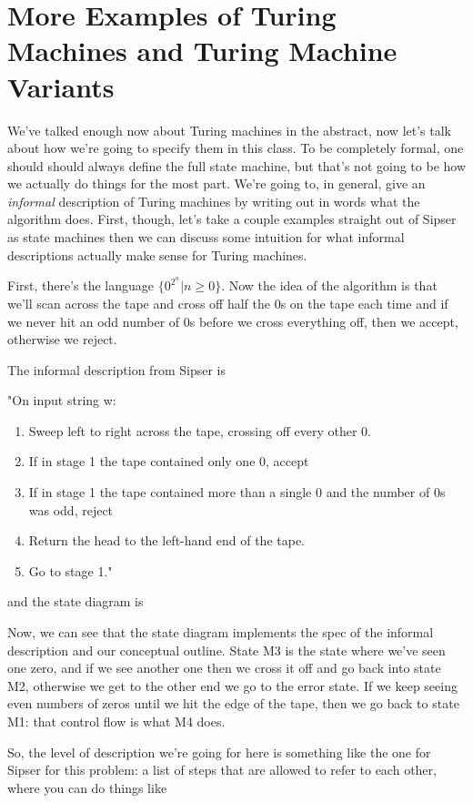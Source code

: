\documentclass[11pt]{article}
\begin{document}
\section{More Examples of Turing Machines and Turing Machine Variants}
\label{sec-11}
We've talked enough now about Turing machines in the abstract, now let's talk about how we're going to specify them in this class. To be completely formal, one should should always define the full state machine, but that's not going to be how we actually do things for the most part. We're going to, in general, give an \emph{informal} description of Turing machines by writing out in words what the algorithm does. First, though, let's take a couple examples straight out of Sipser as state machines then we can discuss some intuition for what informal descriptions actually make sense for Turing machines. 

First, there's the language $\{0^{2^n} | n \ge 0\}$. Now the idea of the algorithm is that we'll scan across the tape and cross off half the 0s on the tape each time and if we never hit an odd number of 0s before we cross everything off, then we accept, otherwise we reject.

The informal description from Sipser is

"On input string w: 
\begin{enumerate}
\item Sweep left to right across the tape, crossing off every other 0.
\item If in stage 1 the tape contained only one 0, accept
\item If in stage 1 the tape contained more than a single 0 and the number of 0s was odd, reject
\item Return the head to the left-hand end of the tape.
\item Go to stage 1."
\end{enumerate}

and the state diagram is 

Now, we can see that the state diagram implements the spec of the informal description and our conceptual outline. State M3 is the state where we've seen one zero, and if we see another one then we cross it off and go back into state M2, otherwise we get to the other end we go to the error state. If we keep seeing even numbers of zeros until we hit the edge of the tape, then we go back to state M1: that control flow is what M4 does.

So, the level of description we're going for here is something like the one for Sipser for this problem: a list of steps that are allowed to refer to each other, where you can do things like 
\end{document}
